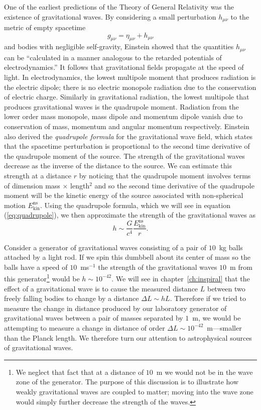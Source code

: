 One of the earliest predictions of the Theory of General Relativity was the
existence of gravitational waves. By considering a small perturbation
$h_{\mu\nu}$ to the metric of empty spacetime
\begin{equation}
g_{\mu\nu} = \eta_{\mu\nu} + h_{\mu\nu}
\end{equation}
and bodies with negligible self-gravity, Einstein showed that the quantities
$h_{\mu\nu}$ can be ``calculated in a manner analogous to the retarded
potentials of electrodynamics\cite{Einstein:1916}.''  It follows that
gravitational fields propagate at the speed of light.  In electrodynamics, the
lowest multipole moment that produces radiation is the electric dipole; there
is no electric monopole radiation due to the conservation of electric charge.
Similarly in gravitational radiation, the lowest multipole that produces
gravitational waves is the quadrupole moment. Radiation from the lower order
mass monopole, mass dipole and momentum dipole vanish due to conservation of
mass, momentum and angular momentum respectively. Einstein also derived the
\emph{quadrupole formula} for the gravitational wave field, which states that
the spacetime perturbation is proportional to the second time derivative of
the quadrupole moment of the source.  The strength of the gravitational waves
decrease as the inverse of the distance to the source.  We can estimate
this strength at a distance $r$ by noticing that the quadrupole moment
involves terms of dimension mass $\times$ length$^2$ and so the second time
derivative of the quadrupole moment will be the kinetic energy of the source
associated with non-spherical motion $E^\mathrm{ns}_\mathrm{kin}$. Using the
quadrupole formula, which we will see in equation (\ref{eq:quadrupole}), we
then approximate the strength of the gravitational waves as
\begin{equation}
h \sim \frac{G}{c^4}\frac{E^\mathrm{ns}_\mathrm{kin}}{r}.
\label{eq:strainest}
\end{equation}

Consider a generator of gravitational waves consisting of a pair of $10$~kg
balls attached by a light rod. If we spin this dumbbell about its center of
mass so the balls have a speed of $10$~ms$^{-1}$ the strength of the
gravitational waves $10$~m from this generator\footnote{We neglect that fact
that at a distance of $10$~m we would not be in the wave zone of the
generator. The purpose of this discussion is to illustrate how weakly
gravitational waves are coupled to matter; moving into the wave zone would
simply further decrease the strength of the waves.} would be $h \sim
10^{-42}$.  We will see in chapter~\ref{ch:inspiral} that the effect of a
gravitational wave is to cause the measured distance $L$ between two freely
falling bodies to change by a distance $\Delta L \sim h L$. Therefore if we
tried to measure the change in distance produced by our laboratory generator
of gravitational waves between a pair of masses separated by $1$~m, we would
be attempting to measure a change in distance of order $\Delta L \sim
10^{-42}$~m---smaller than the Planck length.  We therefore turn our
attention to astrophysical sources of gravitational waves.

